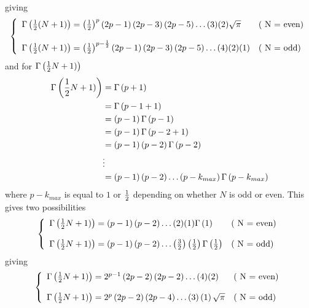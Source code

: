 giving
\begin{align}
\left\{\begin{array}{ll}
\Gamma\left(\frac{1}{2} (N+1)\right) =\left(\frac{1}{2}\right)^{p }\left(2p-1\right)\left(2p-3\right)\left(2p-5\right)\dots (3)(2)\sqrt{\pi}& \text{( N = even)}\\\\
\Gamma\left(\frac{1}{2} (N+1)\right) = \left(\frac{1}{2}\right)^{p -\frac{1}{2}}\left(2p-1\right)\left(2p-3\right)\left(2p-5\right)\dots  (4)(2)(1)& \text{( N = odd)}\\
\end{array}\right.
\end{align}
and for $\Gamma\left(\frac{1}{2} N+1)\right)$
\begin{align}
\Gamma\left(\frac{1}{2} N+1)\right) &= \Gamma\left(p+ 1\right)\\
&= \Gamma\left(p-1+1 \right)\\
&= \left(p-1\right)\Gamma\left(p-1 \right)\\
&= \left(p-1\right)\Gamma\left(p-2 +1\right)\\
&= \left(p-1\right)\left(p-2\right)\Gamma\left(p-2 \right)\\
&\vdots\\ 
&= \left(p-1\right)\left(p-2\right)\dots \left(p- k_{max}\right)\Gamma\left(p- k_{max}\right)
\end{align}
where $ p- k_{max}$ is equal to $1$ or $\frac{1}{2}$ depending on whether $N$ is odd or even.
This gives two possibilities
\begin{align}
\left\{\begin{array}{ll}
\Gamma\left(\frac{1}{2} N+1)\right) = \left(p-1\right)\left(p-2\right)\dots (2)(1)\Gamma\left(1  \right)& \text{( N = even)}\\\\
\Gamma\left(\frac{1}{2} N+1)\right) = \left(p-1\right)\left(p-2\right)\dots \left(\frac{3}{2}\right)\left( \frac{1}{2}\right)\Gamma\left(\frac{1}{2} \right)& \text{( N = odd)}\\
\end{array}\right.
\end{align}
giving
\begin{align}
\left\{\begin{array}{ll}
\Gamma\left(\frac{1}{2} N+1)\right) = 2^{p-1}\left(2p-2\right)\left(2p-2\right)\dots (4)(2)& \text{( N = even)}\\\\
\Gamma\left(\frac{1}{2} N+1)\right) = 2^{p}\left(2p-2\right)\left(2p-4\right)\dots \left(3\right)\left( 1\right)\sqrt{\pi}& \text{( N = odd)}\\
\end{array}\right.
\end{align}
